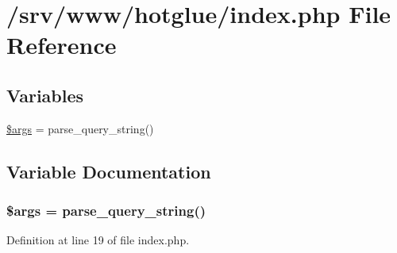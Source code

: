 \hypertarget{index_8php}{
\section{/srv/www/hotglue/index.php File Reference}
\label{index_8php}
}
\subsection*{Variables}
\begin{DoxyCompactItemize}
\item 
\hyperlink{index_8php_a67e94494731d99ed23b123e95175bc10}{\$args} = parse\_\-query\_\-string()
\end{DoxyCompactItemize}


\subsection{Variable Documentation}
\hypertarget{index_8php_a67e94494731d99ed23b123e95175bc10}{
\subsubsection[{\$args}]{\setlength{\rightskip}{0pt plus 5cm}\$args = parse\_\-query\_\-string()}}
\label{index_8php_a67e94494731d99ed23b123e95175bc10}


Definition at line 19 of file index.php.

